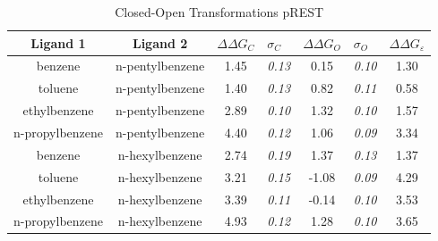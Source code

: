 \documentclass[T4paper.tex]{subfiles}
\begin{document}
\begin{table}[!htb]
\centering
\caption{Closed-Open Transformations pREST}
\label{tbl:C-O_pREST}
\begin{tabular}{|c|c|c|l|c|l|c|}
\hline
\textbf{Ligand 1}       & \textbf{Ligand 2}    & {\color[HTML]{800080} \boldmath$\Delta\Delta G_{C}$} & {\color[HTML]{800080} \boldmath$\sigma_{C}$} & {\color[HTML]{008000} \boldmath$\Delta\Delta G_{O}$} & {\color[HTML]{008000} \boldmath$\sigma_{O}$} & \boldmath$\Delta\Delta G_{\varepsilon}$\\ \hline
benzene         & n-pentylbenzene & 1.45                                   & \textit{0.13}                       & 0.15                                & \textit{0.10}                       & \cellcolor[HTML]{FFCCC9}1.30 \\ \hline
toluene         & n-pentylbenzene & 1.40                                   & \textit{0.13}                       & 0.82                                 & \textit{0.11}                       & \cellcolor[HTML]{9AFF99}0.58 \\ \hline
ethylbenzene    & n-pentylbenzene & 2.89                                   & \textit{0.10}                       & 1.32                                 & \textit{0.10}                       & \cellcolor[HTML]{FFCCC9}1.57 \\ \hline
n-propylbenzene & n-pentylbenzene & 4.40                                   & \textit{0.12}                       & 1.06                                & \textit{0.09}                       & \cellcolor[HTML]{FFCCC9}3.34 \\ \hline
benzene         & n-hexylbenzene  & 2.74                                   & \textit{0.19}                       & 1.37                                & \textit{0.13}                       & \cellcolor[HTML]{FFCCC9}1.37 \\ \hline
toluene         & n-hexylbenzene  & 3.21                                   & \textit{0.15}                       & -1.08                                & \textit{0.09}                       & \cellcolor[HTML]{FFCCC9}4.29 \\ \hline
ethylbenzene    & n-hexylbenzene  & 3.39                                   & \textit{0.11}                       & -0.14                                & \textit{0.10}                       & \cellcolor[HTML]{FFCCC9}3.53 \\ \hline
n-propylbenzene & n-hexylbenzene  & 4.93                                   & \textit{0.12}                       & 1.28                                 & \textit{0.10}                       & \cellcolor[HTML]{FFCCC9}3.65 \\ \hline
\end{tabular}

\end{table}
\end{document}
